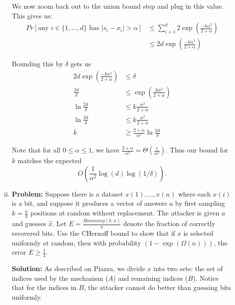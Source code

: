 \documentclass{article}
\newcommand{\abs}[1]{\vert #1 \vert}
\begin{document}
\begin{enumerate}[(a)]
\begin{enumerate}[(i)]
                We now zoom back out to the union bound step and plug in this value.  This gives us:
                \begin{align*} Pr[\text{any }i \in \{1,\ldots,d\}\text{ has }\abs{s_i - x_i} >
                    \alpha] &\le \sum_{i=1}^d 2\exp\left( \frac{-k\alpha^2}{2 + \alpha} \right)  \\
                    &\le 2d\exp\left( \frac{-k\alpha^2}{2 + \alpha} \right) 
                \end{align*}

                Bounding this by $\delta$ gets us
                \begin{align*}
                    2d\exp\left( \frac{-k\alpha^2}{2+\alpha} \right) &\le \delta \\
                    \frac{2d}{\delta} &\le \exp\left( \frac{k\alpha^2}{2+\alpha} \right) \\
                    \ln \frac{2d}{\delta} &\le k\frac{\alpha^2}{2+\alpha} \\
                    \ln \frac{2d}{\delta} &\le k\frac{\alpha^2}{2+\alpha} \\
                    k &\ge \frac{2+\alpha}{\alpha^2} \ln \frac{2d}{\delta}
                \end{align*}

                Note that for all $0 \le \alpha \le 1$, we have $\frac{2+\alpha}{\alpha^2} = \Theta\left(
                \frac{1}{\alpha^2} \right)$.  Thus our bound for $k$ matches the expected
                \[ O\left( \frac{1}{\alpha^2}\log(d)\log(1/\delta)\right). \]

            \item \textbf{Problem:} Suppose there is a dataset $x(1), \ldots, x(n)$ where each $x(i)$ is a bit, and suppose it
                produces a vector of answers $a$ by first sampling $k = \frac{n}{3}$ positions at random without
                replacement.  The attacker is given $a$ and guesses $\hat{x}$.  Let $E = \frac{Hamming(\hat{x}, x)}{n}$
                denote the fraction of correctly recovered bits.  Use the CHernoff bound to show that if $x$ is
                selected uniformly at random, then with probability $(1-\exp(\Omega(n)))$, the error $E \ge \frac14$.

                \textbf{Solution:} As described on Piazza, we divide $x$ into two sets: the set of indices used by the
                mechanism ($A$) and remaining indices ($B$).  Notice that for the indices in $B$, the attacker cannot
                do better than guessing bits uniformly.


\end{enumerate}
\end{enumerate}
\end{document}
